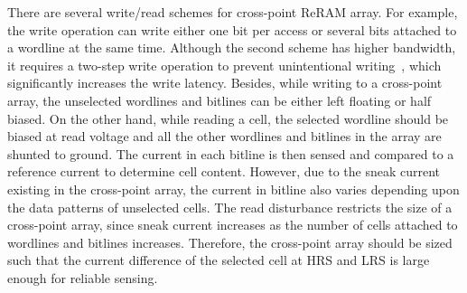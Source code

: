 There are several write/read schemes for cross-point ReRAM array. For
example, the write operation can write either one bit per access or
several bits attached to a wordline at the same time. Although the second
scheme has higher bandwidth, it requires a two-step write operation to
prevent unintentional writing~\cite{memristor:Cong}, which significantly
increases the write latency.
Besides, while writing to a cross-point array, the unselected wordlines
and bitlines can be either left floating or half biased. On the other
hand, while reading a cell, the selected wordline should be biased at read
voltage and all the other wordlines and bitlines in the array are shunted
to ground. The current in each bitline is then sensed and compared to a
reference current to determine cell content. However, due to the sneak
current existing in the cross-point array, the current in bitline also
varies depending upon the data patterns of unselected cells.
The read disturbance restricts the size of a cross-point array, since
sneak current increases as the number of cells attached to wordlines and
bitlines increases. Therefore, the cross-point array should be sized such
that the current difference of the selected cell at HRS and LRS is large
enough for reliable sensing. 


